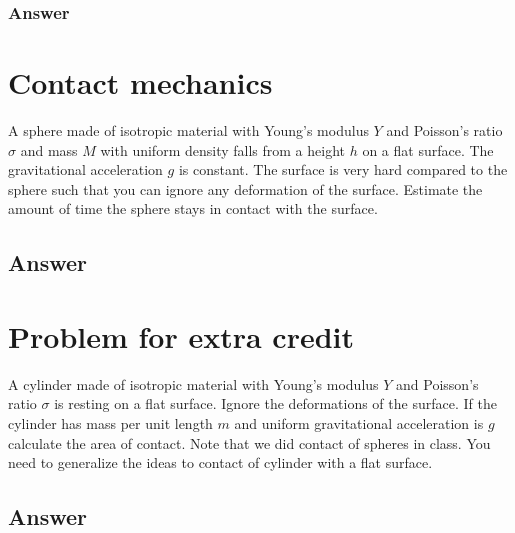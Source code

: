 \documentclass{article}
\begin{document}
\subsubsection*{Answer}




\section*{Contact mechanics}
A sphere made of isotropic material with Young's modulus $Y$ and Poisson's ratio $\sigma$ and mass $M$ with uniform density falls from a height $h$ on a flat surface.
The gravitational acceleration $g$ is constant. The surface is very hard compared to the sphere such that you can ignore any deformation of the surface. Estimate the amount of time the sphere stays in contact with the surface.

\subsection*{Answer}

\section*{Problem for extra credit}
A cylinder made of isotropic material with Young's modulus $Y$ and Poisson's ratio $\sigma$ is resting on a flat surface. Ignore the deformations of the surface.
If the cylinder has mass per unit length $m$ and uniform gravitational acceleration is $g$ calculate the area of contact. Note that we did contact of spheres in class. You need to generalize the ideas to contact of cylinder with a flat surface.

\subsection*{Answer}
\end{document}
